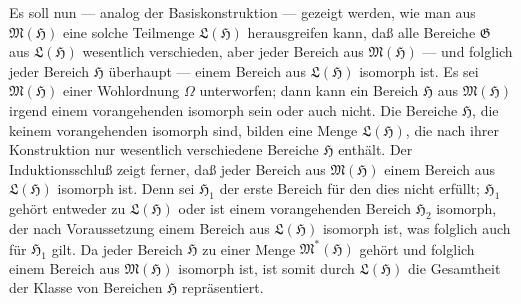 \documentclass[12pt,a4paper]{article}
\begin{document}
Es soll nun --- analog der Basiskonstruktion --- gezeigt werden, wie man aus $\mathfrak{M}(\mathfrak{H})$ eine solche Teilmenge $\mathfrak{L}(\mathfrak{H})$ herausgreifen kann, da\ss{} alle Bereiche $\mathfrak{G}$ aus $\mathfrak{L}(\mathfrak{H})$ wesentlich verschieden, aber jeder Bereich aus $\mathfrak{M}(\mathfrak{H})$ --- und folglich jeder Bereich $\mathfrak{H}$ \"uberhaupt --- einem Bereich aus $\mathfrak{L}(\mathfrak{H})$ isomorph ist. Es sei $\mathfrak{M}(\mathfrak{H})$ einer Wohlordnung $\Omega$ unterworfen; dann kann ein Bereich $\mathfrak{H}$ aus $\mathfrak{M}(\mathfrak{H})$ irgend einem vorangehenden isomorph sein oder auch nicht. Die Bereiche $\mathfrak{H}$, die keinem vorangehenden isomorph sind, bilden eine Menge $\mathfrak{L}(\mathfrak{H})$, die nach ihrer Konstruktion nur wesentlich verschiedene Bereiche $\mathfrak{H}$ enth\"alt. Der Induktionsschlu\ss{} zeigt ferner, da\ss{} jeder Bereich aus $\mathfrak{M}(\mathfrak{H})$ einem Bereich aus $\mathfrak{L}(\mathfrak{H})$ isomorph ist. Denn sei $\mathfrak{H}_1$ der erste Bereich f\"ur den dies nicht erf\"ullt; $\mathfrak{H}_1$ geh\"ort entweder zu $\mathfrak{L}(\mathfrak{H})$ oder ist einem vorangehenden Bereich $\mathfrak{H}_2$ isomorph, der nach Voraussetzung einem Bereich aus $\mathfrak{L}(\mathfrak{H})$ isomorph ist, was folglich auch f\"ur $\mathfrak{H}_1$ gilt. Da jeder Bereich $\mathfrak{H}$ zu einer Menge $\mathfrak{M}^*(\mathfrak{H})$ geh\"ort und folglich einem Bereich aus $\mathfrak{M}(\mathfrak{H})$ isomorph ist, ist somit durch $\mathfrak{L}(\mathfrak{H})$ die Gesamtheit der Klasse von Bereichen $\mathfrak{H}$ repr\"asentiert.
\end{document}
